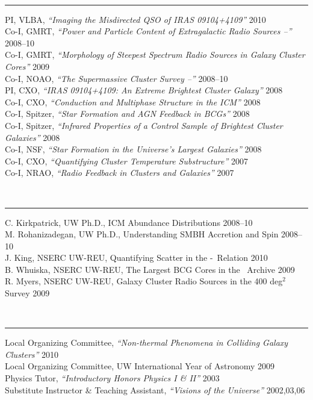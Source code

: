 \documentclass[12pt]{cv}
\begin{document}
{\large{}}\vspace{-0.3cm}\\
\rule{\linewidth}{0.5pt}
PI, VLBA, {\it{``Imaging the Misdirected QSO of IRAS 09104+4109''}} \hfill 2010\\
Co-I, GMRT, {\it{``Power and Particle Content of Extragalactic Radio Sources --''}} \hfill 2008--10\\
Co-I, GMRT, {\it{``Morphology of Steepest Spectrum Radio Sources in Galaxy Cluster Cores''}} \hfill 2009\\
Co-I, NOAO, {\it{``The Supermassive Cluster Survey --''}} \hfill 2008--10\\
PI, CXO, {\it{``IRAS 09104+4109: An Extreme Brightest Cluster Galaxy''}} \hfill 2008\\
Co-I, CXO, {\it``{Conduction and Multiphase Structure in the ICM''}} \hfill 2008\\
Co-I, Spitzer, {\it{``Star Formation and AGN Feedback in BCGs''}} \hfill 2008\\
Co-I, Spitzer, {\it{``Infrared Properties of a Control Sample of Brightest Cluster Galaxies''}} \hfill 2008\\
Co-I, NSF, {\it{``Star Formation in the Universe's Largest Galaxies''}} \hfill 2008\\
Co-I, CXO, {\it{``Quantifying Cluster Temperature Substructure''}} \hfill 2007\\
Co-I, NRAO, {\it{``Radio Feedback in Clusters and Galaxies''}} \hfill 2007

{\large{}}\vspace{-0.3cm}\\
\rule{\linewidth}{0.5pt}
C. Kirkpatrick, UW Ph.D., ICM Abundance Distributions \hfill 2008--10\\
M. Rohanizadegan, UW Ph.D., Understanding SMBH Accretion and Spin \hfill 2008--10\\
J. King, NSERC UW-REU, Quantifying Scatter in the \pjet-\prad\ Relation \hfill 2010\\
B. Whuiska, NSERC UW-REU, The Largest BCG Cores in the \hst\ Archive \hfill 2009\\
R. Myers, NSERC UW-REU, Galaxy Cluster Radio Sources in the 400 deg$^2$ Survey \hfill 2009

{\large{}}\vspace{-0.3cm}\\
\rule{\linewidth}{0.5pt}
Local Organizing Committee, {\it{``Non-thermal Phenomena in Colliding Galaxy Clusters''}} \hfill 2010\\
Local Organizing Committee, UW International Year of Astronomy \hfill 2009\\
Physics Tutor, {\it{``Introductory Honors Physics I \& II''}} \hfill 2003\\
Substitute Instructor \& Teaching Assistant, {\it{``Visions of the Universe''}} \hfill 2002,03,06
\end{document}
